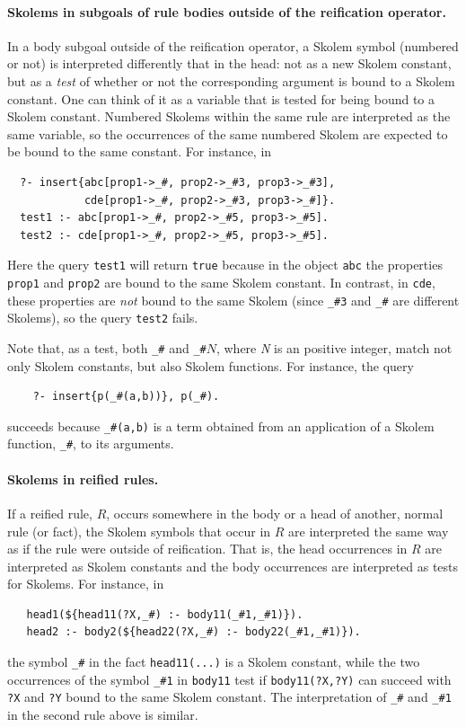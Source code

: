 \documentclass[11pt]{article}
\begin{document}
\paragraph{Skolems in subgoals of rule bodies outside of the reification operator.}
In a body subgoal outside of the reification operator, a Skolem
symbol (numbered or not) is interpreted differently that in the head: not
as a new  Skolem constant,
but as a \emph{test} of whether or not the
corresponding argument is bound to a Skolem constant. One can think of it
as a variable that is tested for being bound to a Skolem constant.
Numbered Skolems within the same rule are interpreted as the same variable,
so the occurrences of the same numbered Skolem are expected to be bound to
the same constant. For instance, in
\begin{verbatim}
  ?- insert{abc[prop1->_#, prop2->_#3, prop3->_#3],
            cde[prop1->_#, prop2->_#3, prop3->_#]}.
  test1 :- abc[prop1->_#, prop2->_#5, prop3->_#5].
  test2 :- cde[prop1->_#, prop2->_#5, prop3->_#5].
\end{verbatim}
Here the query \texttt{test1} will return \texttt{true} because in the
object \texttt{abc} the properties \texttt{prop1} and \texttt{prop2} are
bound to the same Skolem constant. In contrast, in \texttt{cde}, these
properties are \emph{not} bound to the same Skolem (since \texttt{\_\#3} and
\texttt{\_\#} are different Skolems), so the query \texttt{test2} fails. 

Note that, as a test, both \texttt{\_\#} and \texttt{\_\#}$N$, where
\emph{N} is an positive integer, match not only Skolem constants, but also
Skolem functions. For instance, the query
\begin{verbatim}
    ?- insert{p(_#(a,b))}, p(_#).
\end{verbatim}
succeeds because \verb|_#(a,b)| is a term obtained from an application of a
Skolem function, \verb|_#|, to its arguments.

\paragraph{Skolems in reified rules.}
If a reified rule, $R$,
occurs somewhere in the body or a head of another, normal rule (or fact),
the Skolem symbols that occur in $R$ are interpreted the same way as if the
rule were outside of reification. That is, the head occurrences in $R$ are
interpreted as Skolem constants and the body occurrences are interpreted as
tests for Skolems. For instance, in
\begin{verbatim}
   head1(${head11(?X,_#) :- body11(_#1,_#1)}).
   head2 :- body2(${head22(?X,_#) :- body22(_#1,_#1)}).
\end{verbatim}
the symbol \verb|_#| in the fact \texttt{head11(...)} is a Skolem constant, while the
two occurrences of the symbol \verb|_#1| in \texttt{body11} test if
\texttt{body11(?X,?Y)} can succeed with \texttt{?X} and \texttt{?Y} bound
to the same Skolem constant. The interpretation of \verb|_#| and \verb|_#1|
in the second rule above is similar.    
\end{document}
